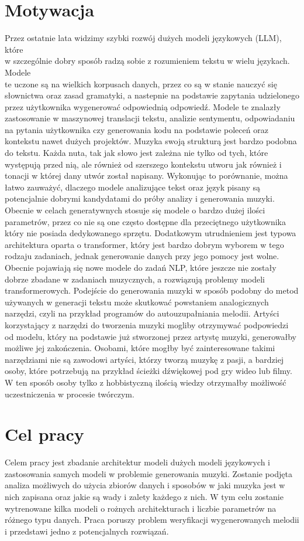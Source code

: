 \documentclass[data-science]{agh-wi} %
\begin{document}
\section{Motywacja}
Przez ostatnie lata widzimy szybki rozwój dużych modeli językowych (LLM), które\\ w szczególnie dobry sposób radzą sobie z rozumieniem tekstu w wielu językach. Modele\\ te uczone są na wielkich korpusach danych, przez co są w stanie nauczyć się słownictwa oraz zasad gramatyki, a nastepnie na podstawie zapytania udzielonego przez użytkownika wygenerować odpowiednią odpowiedź. Modele te znalazły zastosowanie w maszynowej translacji tekstu, analizie sentymentu, odpowiadaniu na pytania użytkownika czy generowania kodu na podstawie poleceń oraz kontekstu nawet dużych projektów. Muzyka swoją strukturą jest bardzo podobna do tekstu. Każda nuta, tak jak słowo jest zależna nie tylko od tych, które występują przed nią, ale również od szerszego kontekstu utworu jak również i tonacji w której dany utwór został napisany. Wykonując to porównanie, można łatwo zauważyć, dlaczego modele analizujące tekst oraz język pisany są potencjalnie dobrymi kandydatami do próby analizy i generowania muzyki. Obecnie w celach generatywnych stosuje się modele o bardzo dużej ilości parametrów, przez co nie są one często dostępne dla przeciętnego użytkownika który nie posiada dedykowanego sprzętu. Dodatkowym utrudnieniem jest typowa architektura oparta o transformer, który jest bardzo dobrym wyborem w tego rodzaju zadaniach, jednak generowanie danych przy jego pomocy jest wolne. Obecnie pojawiają się nowe modele do zadań NLP, które jeszcze nie zostały dobrze zbadane w zadaniach muzycznych, a rozwiązują problemy modeli transformerowych. Podejście do generowania muzyki w sposób podobny do metod używanych w generacji tekstu może skutkować powstaniem analogicznych narzędzi, czyli na przykład programów do autouzupałniania melodii. Artyści korzystający z narzędzi do tworzenia muzyki mogliby otrzymywać podpowiedzi od modelu, który na podstawie już stworzonej przez artystę muzyki, generowałby możliwe jej zakończenia. Osobami, które mogłby być zainteresowane takimi narzędziami nie są zawodowi artyści, którzy tworzą muzykę z pasji, a bardziej osoby, które potrzebują na przykład ścieżki dźwiękowej pod gry wideo lub filmy. W ten sposób osoby tylko z hobbistyczną ilością wiedzy otrzymałby możliwość uczestniczenia w procesie twórczym.
\section{Cel pracy}
Celem pracy jest zbadanie architektur modeli dużych modeli językowych i zastosowania samych modeli w problemie generowania muzyki. Zostanie podjęta analiza możliwych do użycia zbiorów danych i sposobów w jaki muzyka jest w nich zapisana oraz jakie są wady i zalety każdego z nich. W tym celu zostanie wytrenowane kilka modeli o rożnych architekturach i liczbie parametrów na różnego typu danych. Praca poruszy problem weryfikacji wygenerowanych melodii i przedstawi jedno z potencjalnych rozwiązań.
\end{document}
